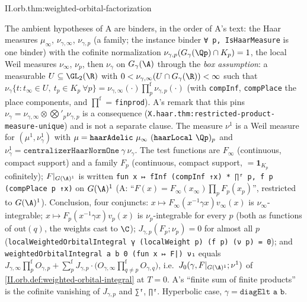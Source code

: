 \begin{tfformal}{II.orb.thm:weighted-orbital-factorization}
\begin{tffidelity}
The ambient hypotheses of A are binders, in the order of A's text: the Haar measures $\mu_\infty$, $\nu_{\gamma,\infty}$, $\nu_{\gamma,p}$ (a family; the instance binder \texttt{∀ p, IsHaarMeasure} is one binder) with the cofinite normalization $\nu_{\gamma,p}(G_\gamma(\Qp)\cap K_p)=1$, the local Weil measures $\nu_\infty$, $\nu_p$, then $\nu_\gamma$ on $G_\gamma(\A)$ through the \emph{box assumption}: a measurable $U\subseteq\GL_2(\R)$ with $0<\nu_{\gamma,\infty}(U\cap G_\gamma(\R))<\infty$ such that $\nu_\gamma\{t:t_\infty\in U,\ t_p\in K_p\ \forall p\}=\nu_{\gamma,\infty}(\cdot)\prod^{\mathrm f}_p\nu_{\gamma,p}(\cdot)$ (with \texttt{compInf}, \texttt{compPlace} the place components, and $\prod^{\mathrm f}$ = \texttt{finprod}). A's remark that this pins $\nu_\gamma=\nu_{\gamma,\infty}\otimes\bigotimes'_p\nu_{\gamma,p}$ is a consequence (\texttt{X.haar.thm:restricted-product-measure-unique}) and is not a separate clause. The measure $\nu^1$ is a Weil measure for $(\mu^1,\nu_\gamma^1)$ with $\mu=\texttt{haarAdelic}\ \mu_\infty\ (\texttt{haarLocal}\ \Qp)_p$ and $\nu^1_\gamma=\texttt{centralizerHaarNormOne}\ \gamma\ \nu_\gamma$. The test functions are $F_\infty$ (continuous, compact support) and a family $F_p$ (continuous, compact support, $=\mathbf 1_{K_p}$ cofinitely); $F|_{G(\A)^1}$ is written \texttt{fun x ↦ fInf (compInf ↑x) * ∏ᶠ p, f p (compPlace p ↑x)} on $G(\A)^1$ (A: ``$F(x)=F_\infty(x_\infty)\prod_pF_p(x_p)$'', restricted to $G(\A)^1$). Conclusion, four conjuncts: $x\mapsto F_\infty(x^{-1}\gamma x)v_\infty(x)$ is $\nu_\infty$-integrable; $x\mapsto F_p(x^{-1}\gamma x)v_p(x)$ is $\nu_p$-integrable for every $p$ (both as functions of $\mathrm{out}(q)$, the weights cast to $\C$); $J_{\gamma,p}(F_p;\nu_p)=0$ for almost all $p$ (\texttt{localWeightedOrbitalIntegral γ (localWeight p) (f p) (ν p) = 0}); and \texttt{weightedOrbitalIntegral a b 0 (fun x ↦ F|) ν₁} equals $J_{\gamma,\infty}\prod^{\mathrm f}_pO_{\gamma,p}+\sum^{\mathrm f}_pJ_{\gamma,p}\cdot\bigl(O_{\gamma,\infty}\prod^{\mathrm f}_{q\ne p}O_{\gamma,q}\bigr)$, i.e.\ $J_0(\gamma,F|_{G(\A)^1};\nu^1)$ of \cref{II.orb.def:weighted-orbital-integral} at $T=0$. A's ``finite sum of finite products'' is the cofinite vanishing of $J_{\gamma,p}$ and \texttt{∑ᶠ}, \texttt{∏ᶠ}. Hyperbolic case, $\gamma=\texttt{diagElt a b}$.
\end{tffidelity}
\end{tfformal}
